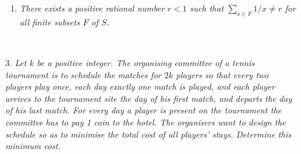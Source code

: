 \documentclass[a4paper, 12pt]{article}
\begin{document}
\begin{enumerate}
\begin{enumerate}
    \item \textit{There exists a positive rational number $r<1$ such that $\sum_{x \in F} 1/x \not = r$ for all finite subsets $F$ of $S$.}
\end{enumerate} \\



\vspace{5mm}

\item[3.]  \textit{Let $k$ be a positive integer. The organising committee of a tennis tournament is to schedule the matches for $2k$ players so that every two players play once, each day exactly one match is played, and each player arrives to the tournament site the day of his first match, and departs the day of his last match. For every day a player is present on the tournament the committee has to pay 1 coin to the hotel. The organisers want to design the schedule so as to minimise the total cost of all players' stays. Determine this minimum cost.
}
 \vspace{5mm}


\vspace{6mm}


    

\end{enumerate}
\end{document}
